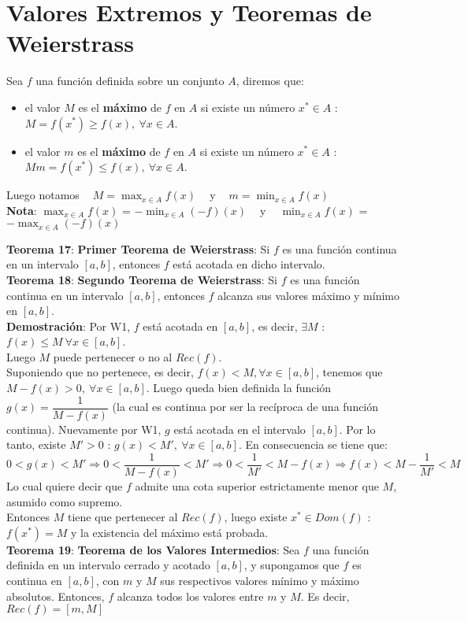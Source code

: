 \documentclass[11pt,a4paper]{article}
\begin{document}
\section{Valores Extremos y Teoremas de Weierstrass}
Sea $f$ una funci\'on definida sobre un conjunto $A$, diremos que:
\begin{itemize}
\item el valor $M$ es el \textbf{m\'aximo} de $f$ en $A$ si existe un n\'umero $x^* \in A$ : $M = f(x^*) \geq f(x),\ \forall x \in A$.
\item el valor $m$ es el \textbf{m\'aximo} de $f$ en $A$ si existe un n\'umero $x^* \in A$ : $Mm= f(x^*) \leq f(x),\ \forall x \in A$.
\end{itemize}
Luego notamos $\ \ \ \ M = \displaystyle{\max_{x\in A} f(x)} \ \ \ \ $ y $\ \ \ \ m = \displaystyle{\min_{x\in A} f(x)}$\\

\textbf{Nota}: $\displaystyle{\max_{x\in A} f(x)}$ = $\displaystyle{-\min_{x\in A} (-f)(x)} \ \ \ \ $ y $\ \ \ \ \displaystyle{\min_{x\in A} f(x)}$ = $\displaystyle{-\max_{x\in A} (-f)(x)}$

\newpage

\noindent \textbf{Teorema 17}: \textbf{Primer Teorema de Weierstrass}: Si $f$ es una funci\'on continua en un intervalo $[a,b]$, entonces $f$ est\'a acotada en dicho intervalo.\\

\noindent \textbf{Teorema 18}: \textbf{Segundo Teorema de Weierstrass}: Si $f$ es una funci\'on continua en un intervalo $[a,b]$, entonces $f$ alcanza sus valores m\'aximo y m\'inimo en $[a,b]$.\\
\textbf{Demostraci\'on}: Por W1, $f$ est\'a acotada en $[a,b]$, es decir, $\exists M$ : $f(x)\leq M\ \forall x \in [a,b]$.\\ Luego $M$ puede pertenecer o no al $Rec(f)$. \\ 
Suponiendo que no pertenece, es decir, $f(x)<M, \forall x \in [a,b]$, tenemos que $M-f(x)>0,\ \forall x \in [a,b]$. Luego queda bien definida la funci\'on $g(x)=\dfrac{1}{M-f(x)}$ (la cual es continua por ser la rec\'iproca de una funci\'on continua). Nuevamente por W1, $g$ est\'a acotada en el intervalo $[a,b]$. Por lo tanto, existe $M' > 0$ : $g(x) < M',\ \forall x \in [a,b]$. En consecuencia se tiene que:
$$0 < g(x) < M' \Rightarrow 0 < \dfrac{1}{M-f(x)} < M' \Rightarrow 0 < \dfrac{1}{M'} < M - f(x) \Rightarrow f(x) < M-\dfrac{1}{M'} < M$$
Lo cual quiere decir que $f$ admite una cota superior estrictamente menor que $M$, asumido como supremo.\\
\indent Entonces $M$ tiene que pertenecer al $Rec(f)$, luego existe $x^* \in Dom(f)$ : $f(x^*)=M$ y la existencia del m\'aximo est\'a probada.\\

\noindent \textbf{Teorema 19}: \textbf{Teorema de los Valores Intermedios}: Sea $f$ una funci\'on definida en un intervalo cerrado y acotado $[a,b]$, y supongamos que $f$ es continua en $[a,b]$, con $m$ y $M$ sus respectivos valores m\'inimo y m\'aximo absolutos. Entonces, $f$ alcanza todos los valores entre $m$ y $M$. Es decir, $Rec(f) = [m,M]$
\end{document}
